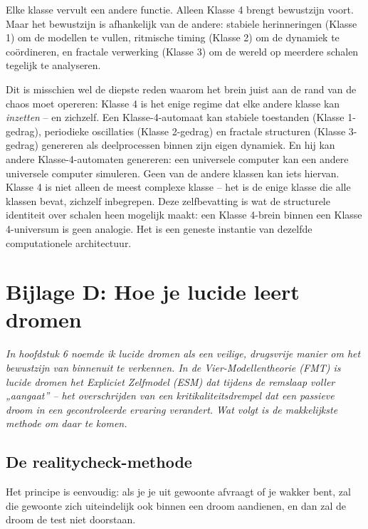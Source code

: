 \documentclass[11pt, twoside, openright]{book}
\begin{document}
Elke klasse vervult een andere functie. Alleen Klasse 4 brengt bewustzijn voort. Maar het bewustzijn is afhankelijk van de andere: stabiele herinneringen (Klasse 1) om de modellen te vullen, ritmische timing (Klasse 2) om de dynamiek te coördineren, en fractale verwerking (Klasse 3) om de wereld op meerdere schalen tegelijk te analyseren.

Dit is misschien wel de diepste reden waarom het brein juist aan de rand van de chaos moet opereren: Klasse 4 is het enige regime dat elke andere klasse kan \textit{inzetten} -- en zichzelf. Een Klasse-4-automaat kan stabiele toestanden (Klasse 1-gedrag), periodieke oscillaties (Klasse 2-gedrag) en fractale structuren (Klasse 3-gedrag) genereren als deelprocessen binnen zijn eigen dynamiek. En hij kan andere Klasse-4-automaten genereren: een universele computer kan een andere universele computer simuleren. Geen van de andere klassen kan iets hiervan. Klasse 4 is niet alleen de meest complexe klasse -- het is de enige klasse die alle klassen bevat, zichzelf inbegrepen. Deze zelfbevatting is wat de structurele identiteit over schalen heen mogelijk maakt: een Klasse 4-brein binnen een Klasse 4-universum is geen analogie. Het is een geneste instantie van dezelfde computationele architectuur.


\chapter*{Bijlage D: Hoe je lucide leert dromen}

\textit{In hoofdstuk 6 noemde ik lucide dromen als een veilige, drugsvrije manier om het bewustzijn van binnenuit te verkennen. In de Vier-Modellentheorie (FMT) is lucide dromen het Expliciet Zelfmodel (ESM) dat tijdens de remslaap voller „aangaat” -- het overschrijden van een kritikaliteitsdrempel dat een passieve droom in een gecontroleerde ervaring verandert. Wat volgt is de makkelijkste methode om daar te komen.}

\section*{De realitycheck-methode}

Het principe is eenvoudig: als je je uit gewoonte afvraagt of je wakker bent, zal die gewoonte zich uiteindelijk ook binnen een droom aandienen, en dan zal de droom de test niet doorstaan.
\end{document}

